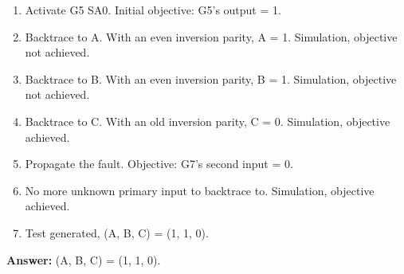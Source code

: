
\begin{enumerate}
  \item Activate G5 SA0. Initial objective: G5's output = 1.
  \item Backtrace to A. With an even inversion parity, A = 1. Simulation, objective not achieved.
  \item Backtrace to B. With an even inversion parity, B = 1. Simulation, objective not achieved.
  \item Backtrace to C. With an old inversion parity, C = 0. Simulation, objective achieved.
  \item Propagate the fault. Objective: G7's second input = 0.
  \item No more unknown primary input to backtrace to. Simulation, objective achieved.
  \item Test generated, (A, B, C) = (1, 1, 0).

\end{enumerate}

\textbf{Answer:} (A, B, C) = (1, 1, 0).

